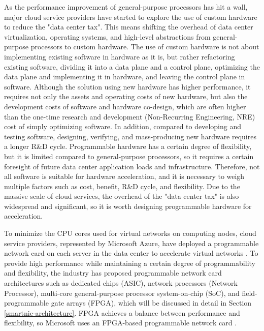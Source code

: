As the performance improvement of general-purpose processors has hit a wall, major cloud service providers have started to explore the use of custom hardware to reduce the "data center tax". This means shifting the overhead of data center virtualization, operating systems, and high-level abstractions from general-purpose processors to custom hardware. The use of custom hardware is not about implementing existing software in hardware as it is, but rather refactoring existing software, dividing it into a data plane and a control plane, optimizing the data plane and implementing it in hardware, and leaving the control plane in software. Although the solution using new hardware has higher performance, it requires not only the assets and operating costs of new hardware, but also the development costs of software and hardware co-design, which are often higher than the one-time research and development (Non-Recurring Engineering, NRE) cost of simply optimizing software. In addition, compared to developing and testing software, designing, verifying, and mass-producing new hardware requires a longer R\&D cycle. Programmable hardware has a certain degree of flexibility, but it is limited compared to general-purpose processors, so it requires a certain foresight of future data center application loads and infrastructure. Therefore, not all software is suitable for hardware acceleration, and it is necessary to weigh multiple factors such as cost, benefit, R\&D cycle, and flexibility. Due to the massive scale of cloud services, the overhead of the "data center tax" is also widespread and significant, so it is worth designing programmable hardware for acceleration.

To minimize the CPU cores used for virtual networks on computing nodes, cloud service providers, represented by Microsoft Azure, have deployed a programmable network card on each server in the data center to accelerate virtual networks \cite{smartnic}. To provide high performance while maintaining a certain degree of programmability and flexibility, the industry has proposed programmable network card architectures such as dedicated chips (ASIC), network processors (Network Processor), multi-core general-purpose processor system-on-chip (SoC), and field-programmable gate arrays (FPGA), which will be discussed in detail in Section \ref{smartnic-architecture}. FPGA achieves a balance between performance and flexibility, so Microsoft uses an FPGA-based programmable network card \cite{putnam2014reconfigurable}.

